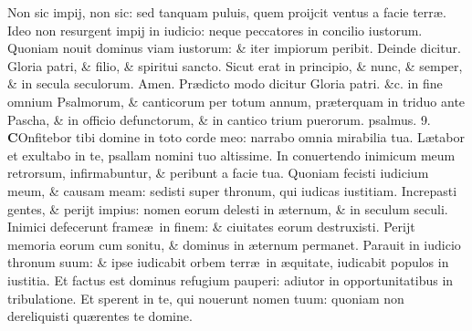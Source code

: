 \documentclass[a5paper,10pt]{book}
\def\ae{æ}
\begin{document}
\begin{multicols*}{2}
\newline \color{red} N\color{black}on sic impij, non sic: sed tanquam puluis, quem proijcit ventus a facie terr\ae .
\newline \color{red} I\color{black}deo non resurgent impij in iudicio: neque peccatores in concilio iustorum.
\newline \color{red} Q\color{black}uoniam nouit dominus viam iustorum: \& iter impiorum peribit.
\color{red} \quad Deinde dicitur. \color{black}
\newline \color{red} G\color{black}loria patri, \& filio, \& spiritui sancto.
\newline \color{red} S\color{black}icut erat in principio, \& nunc, \& semper, \& in secula seculorum. Amen. %
\newline
\color{red} Pr\ae dicto modo dicitur \color{black} Gloria patri. \color{red} \&c. in fine omnium Psalmorum, \& canticorum per totum annum, pr\ae terquam in triduo ante Pascha, \& in officio defunctorum, \& in cantico trium puerorum. \quad psalmus. \hypertarget{ps9}{9.} \color{black}
\lettrine[lines=2]{\bfseries \color{red} C}{}Onfitebor tibi domine in toto corde meo: narrabo omnia mirabilia tua.
\newline \color{red} L\color{black}\ae tabor et exultabo in te, psallam nomini tuo altissime.
\newline \color{red} I\color{black}n conuertendo inimicum meum retrorsum, infirmabuntur, \& peribunt a facie tua.
\newline \color{red} Q\color{black}uoniam fecisti iudicium meum, \& causam meam: sedisti super thronum, qui iudicas iustitiam.
\newline \color{red} I\color{black}ncrepasti gentes, \& perijt impius: nomen eorum delesti in \ae ternum, \& in seculum seculi.
\newline \color{red} I\color{black}nimici defecerunt frame\ae \ in finem: \& ciuitates eorum destruxisti.
\newline \color{red} P\color{black}erijt memoria eorum cum sonitu, \& dominus in \ae ternum permanet.
\newline \color{red} P\color{black}arauit in iudicio thronum suum: \& ipse iudicabit orbem terr\ae \ in \ae quitate, iudicabit populos in iustitia.
\newline \color{red} E\color{black}t factus est dominus refugium pauperi: adiutor in opportunitatibus in tribulatione.
\newline \color{red} E\color{black}t sperent in te, qui nouerunt nomen tuum: quoniam non dereliquisti qu\ae rentes te domine.

\end{multicols*}
\end{document}
